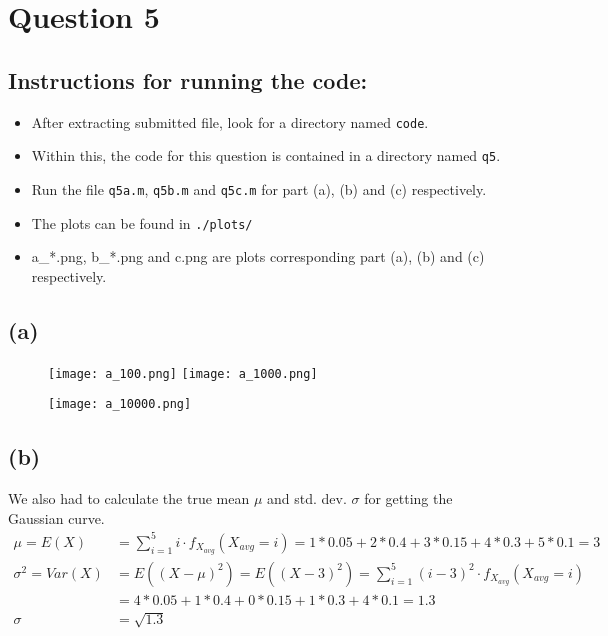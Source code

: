 \documentclass[11pt, fleqn]{article}
\begin{document}
\newpage
\section*{Question 5}
\setcounter{equation}{0}
\subsection*{Instructions for running the code:}
\begin{itemize}
    \item After extracting submitted file, look for a directory named \texttt{code}. 
    \item Within this, the code for this question is contained in a directory named \texttt{q5}.
    \item Run the file \texttt{q5a.m}, \texttt{q5b.m} and \texttt{q5c.m} for part (a), (b) and (c) respectively.
    \item The plots can be found in \texttt{./plots/}
    \item a\_*.png, b\_*.png and c.png are plots corresponding part (a), (b) and (c) respectively.
\end{itemize}

\subsection*{(a)}
\begin{figure}[H]
    \centering
    \begin{floatrow}
        \ffigbox[0.4\textwidth]{}
        {\texttt{[image: a\_100.png]}}
        \ffigbox[0.4\textwidth]{}
        {\texttt{[image: a\_1000.png]}}
    \end{floatrow}
    \vspace{1em}
    \begin{floatrow}
        \ffigbox[0.4\textwidth]{}
        {\texttt{[image: a\_10000.png]}}
    \end{floatrow}
\end{figure}

\subsection*{(b)}
We also had to calculate the true mean $\mu$ and std. dev. $\sigma$ for getting the Gaussian curve.
\begin{equation*}
    \begin{split}
        \mu = E(X) &= \sum_{i=1}^{5} i \cdot f_{X_{avg}}(X_{avg} = i) = 1*0.05 + 2*0.4 + 3*0.15 + 4*0.3 + 5*0.1 = 3 \\
        \sigma^2 = Var(X) &= E((X-\mu)^2) = E((X-3)^2)= \sum_{i=1}^{5} (i - 3)^2 \cdot f_{X_{avg}}(X_{avg} = i) \\
            &= 4*0.05 + 1*0.4 + 0*0.15 + 1*0.3 + 4*0.1 = 1.3 \\
        \sigma &= \sqrt{1.3}
    \end{split}
\end{equation*}
\end{document}
